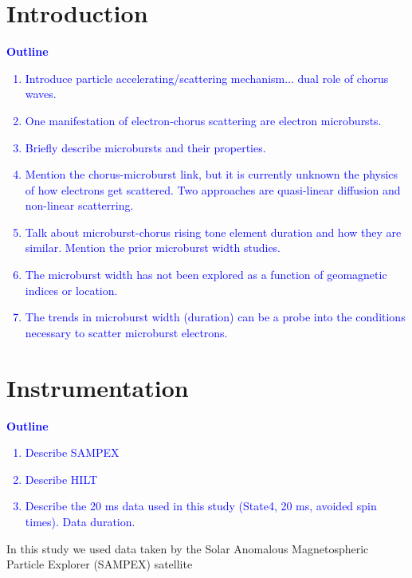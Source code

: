 \documentclass[draft]{agujournal2019}
\begin{document}
\section{Introduction}\label{intro}
\textcolor{blue}{
\textbf{Outline}
\begin{enumerate}
    \item Introduce particle accelerating/scattering mechanism... dual role of chorus waves.
    \item One manifestation of electron-chorus scattering are electron microbursts.
    \item Briefly describe microbursts and their properties.
    \item Mention the chorus-microburst link, but it is currently unknown the physics of how electrons get scattered. Two approaches are quasi-linear diffusion and non-linear scatterring.
    \item Talk about microburst-chorus rising tone element duration and how they are similar. Mention the prior microburst width studies.
    \item The microburst width has not been explored as a function of geomagnetic indices or location.
    \item The trends in microburst width (duration) can be a probe into the conditions necessary to scatter microburst electrons.
\end{enumerate}
}

\section{Instrumentation}\label{instrumentation}
\textcolor{blue}{
\textbf{Outline}
\begin{enumerate}
    \item Describe SAMPEX
    \item Describe HILT
    \item Describe the 20 ms data used in this study (State4, 20 ms, avoided spin times). Data duration.
\end{enumerate}
}
In this study we used data taken by the Solar Anomalous Magnetospheric Particle Explorer (SAMPEX) satellite 
\end{document}
